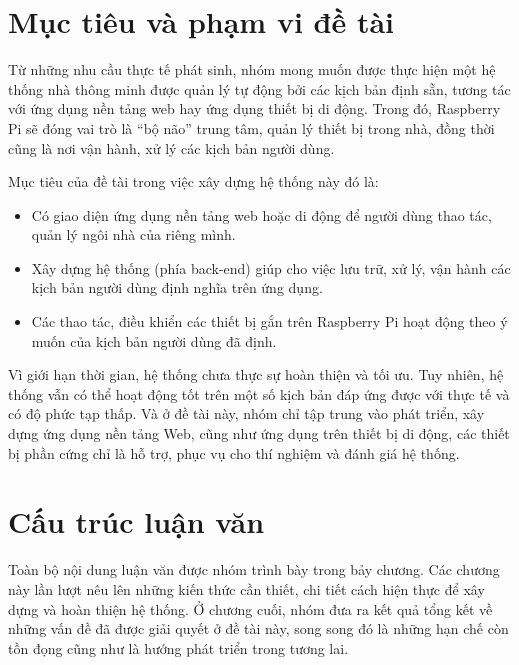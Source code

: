 \documentclass[12pt,a4paper,oneside]{extbook}
\begin{document}
\section{Mục tiêu và phạm vi đề tài}
Từ những nhu cầu thực tế phát sinh, nhóm mong muốn được thực hiện một hệ thống nhà thông minh được quản lý tự động bởi các kịch bản định sẵn, tương tác với ứng dụng nền tảng web hay ứng dụng thiết bị di động. Trong đó, Raspberry Pi sẽ đóng vai trò là “bộ não” trung tâm, quản lý thiết bị trong nhà, đồng thời cũng là nơi vận hành, xử lý các kịch bản người dùng.

Mục tiêu của đề tài trong việc xây dựng hệ thống này đó là:

\begin{itemize}[topsep=1mm,itemsep=-0.5mm]
\item Có giao diện ứng dụng nền tảng web hoặc di động để người dùng thao tác, quản lý ngôi nhà của riêng mình.
\item Xây dựng hệ thống (phía back-end) giúp cho việc lưu trữ, xử lý, vận hành các kịch bản người dùng định nghĩa trên ứng dụng.
\item Các thao tác, điều khiển các thiết bị gắn trên Raspberry Pi hoạt động theo ý muốn của kịch bản người dùng đã định.
\vspace{1mm}
\end{itemize}

Vì giới hạn thời gian, hệ thống chưa thực sự hoàn thiện và tối ưu. Tuy nhiên, hệ thống vẫn có thể hoạt động tốt trên một số kịch bản đáp ứng được với thực tế và có độ phức tạp thấp. Và ở đề tài này, nhóm chỉ tập trung vào phát triển, xây dựng ứng dụng nền tảng Web, cũng như ứng dụng trên thiết bị di động, các thiết bị phần cứng chỉ là hỗ trợ, phục vụ cho thí nghiệm và đánh giá hệ thống.

\section{Cấu trúc luận văn}
Toàn bộ nội dung luận văn được nhóm trình bày trong bảy chương. Các chương này lần lượt nêu lên những kiến thức cần thiết, chi tiết cách hiện thực để xây dựng và hoàn thiện hệ thống. Ở chương cuối, nhóm đưa ra kết quả tổng kết về những vấn đề đã được giải quyết ở đề tài này, song song đó là những hạn chế còn tồn đọng cũng như là hướng phát triển trong tương lai.
\end{document}
